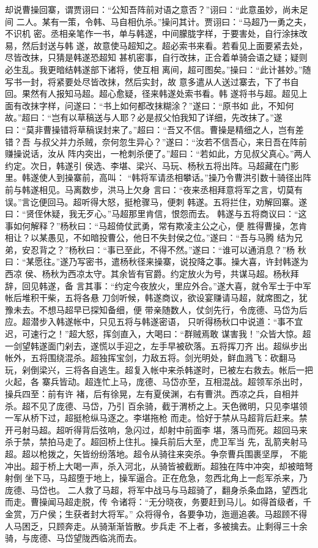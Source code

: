 却说曹操回寨，谓贾诩曰：“公知吾阵前对语之意否？”诩曰：“此意虽妙，尚未足间
二人。某有一策，令韩、马自相仇杀。”操问其计。贾诩曰：“马超乃一勇之夫，不识机
密。丞相亲笔作一书，单与韩遂，中间朦胧字样，于要害处，自行涂抹改易，然后封送与韩
遂，故意使马超知之。超必索书来看。若看见上面要紧去处，尽皆改抹，只猜是韩遂恐超知
甚机密事，自行改抹，正合着单骑会语之疑；疑则必生乱。我更暗结韩遂部下诸将，使互相
离间，超可图矣。”操曰：“此计甚妙。”随写书一封，将紧要处尽皆改抹，然后实封，故
意多遣从人送过寨去，下了书自回。果然有人报知马超。超心愈疑，径来韩遂处索书看。韩
遂将书与超。超见上面有改抹字样，问遂曰：“书上如何都改抹糊涂？”遂曰：“原书如
此，不知何故。”超曰：“岂有以草稿送与人耶？必是叔父怕我知了详细，先改抹了。”遂
曰：“莫非曹操错将草稿误封来了。”超曰：“吾又不信。曹操是精细之人，岂有差错？吾
与叔父并力杀贼，奈何忽生异心？”遂曰：“汝若不信吾心，来日吾在阵前赚操说话，汝从
阵内突出，一枪刺杀便了。”超曰：“若如此，方见叔父真心。”两人约定。次日，韩遂引
侯选、李堪、梁兴、马玩、杨秋五将出阵。马超藏在门影里。韩遂使人到操寨前，高叫：
“韩将军请丞相攀话。”操乃令曹洪引数十骑径出阵前与韩遂相见。马离数步，洪马上欠身
言曰：“夜来丞相拜意将军之言，切莫有误。”言讫便回马。超听得大怒，挺枪骤马，便刺
韩遂。五将拦住，劝解回寨。遂曰：“贤侄休疑，我无歹心。”马超那里肯信，恨怨而去。
韩遂与五将商议曰：“这事如何解释？”杨秋曰：“马超倚仗武勇，常有欺凌主公之心，便
胜得曹操，怎肯相让？以某愚见，不如暗投曹公，他日不失封侯之位。”遂曰：“吾与马腾
结为兄弟，安忍背之？”杨秋曰：“事已至此，不得不然。”遂曰：“谁可以通消息？”杨
秋曰：“某愿往。”遂乃写密书，遣杨秋径来操寨，说投降之事。操大喜，许封韩遂为西凉
侯、杨秋为西凉太守。其余皆有官爵。约定放火为号，共谋马超。杨秋拜辞，回见韩遂，备
言其事：“约定今夜放火，里应外合。”遂大喜，就令军士于中军帐后堆积干柴，五将各悬
刀剑听候，韩遂商议，欲设宴赚请马超，就席图之，犹豫未去。不想马超早已探知备细，便
带亲随数人，仗剑先行，令庞德、马岱为后应。超潜步入韩遂帐中，只见五将与韩遂密语，
只听得杨秋口中说道：“事不宜迟，可速行之！”超大怒，挥剑直入，大喝曰：“群贼焉敢
谋害我！”众皆大惊。超一剑望韩遂面门剁去，遂慌以手迎之，左手早被砍落。五将挥刀齐
出。超纵步出帐外，五将围绕混杀。超独挥宝剑，力敌五将。剑光明处，鲜血溅飞：砍翻马
玩，剁倒梁兴，三将各自逃生。超复入帐中来杀韩遂时，已被左右救去。帐后一把火起，各
寨兵皆动。超连忙上马，庞德、马岱亦至，互相混战。超领军杀出时，操兵四至：前有许
褚，后有徐晃，左有夏侯渊，右有曹洪。西凉之兵，自相并杀。超不见了庞德、马岱，乃引
百余骑，截于渭桥之上。天色微明，只见李堪领一军从桥下过，超挺枪纵马逐之。李堪拖枪
而走。恰好于禁从马超背后赶来。禁开弓射马超。超听得背后弦响，急闪过，却射中前面李
堪，落马而死。超回马来杀于禁，禁拍马走了。超回桥上住扎。操兵前后大至，虎卫军当
先，乱箭夹射马超。超以枪拨之，矢皆纷纷落地。超令从骑往来突杀。争奈曹兵围裹坚厚，
不能冲出。超于桥上大喝一声，杀入河北，从骑皆被截断。超独在阵中冲突，却被暗弩射倒
坐下马，马超堕于地上，操军逼合。正在危急，忽西北角上一彪军杀来，乃庞德、马岱也。
二人救了马超，将军中战马与马超骑了，翻身杀条血路，望西北而走。曹操闻马超走脱，传
令诸将：“无分晓夜，务要赶到马儿。如得首级者，千金赏，万户侯；生获者封大将军。”
众将得令，各要争功，迤逦追袭。马超顾不得人马困乏，只顾奔走。从骑渐渐皆散。步兵走
不上者，多被擒去。止剩得三十余骑，与庞德、马岱望陇西临洮而去。

